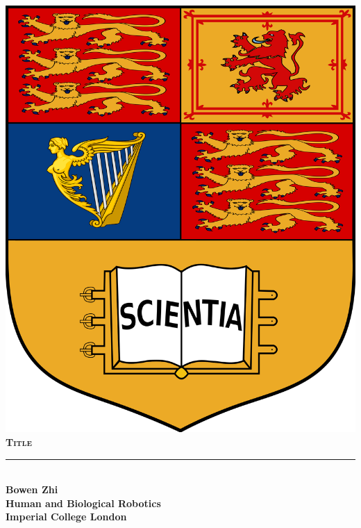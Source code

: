\begin{titlepage}
  \begin{center}
    \begin{minipage}[c][24cm][c]{16cm}
      \begin{center}

        \vspace*{1cm}

        \includegraphics[scale=0.08]{./pictures/ICL_arms.png}\\[1cm]

        \Huge\bfseries\textsc{Title} \\[0.4cm]
        

        \rule{\textwidth}{0.5mm}\\[1cm]

        \Large\textbf{Bowen Zhi} \\[1.8cm]

        \Large \textbf{Human and Biological Robotics} \\
        \textbf{Imperial College London} \\[1cm]


\end{center}
\end{minipage}
\end{center}
\end{titlepage}
